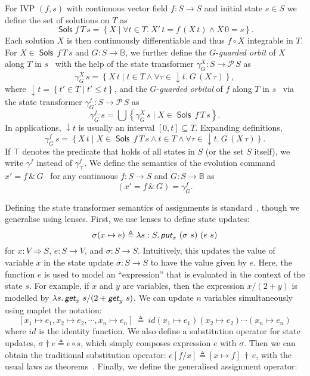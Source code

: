 \documentclass[envcountsame,envcountsect]{llncs}
\newcommand{\Pow}{\mathcal{P}}
\newcommand{\bools}{\mathbb{B}}
\newcommand{\Sols}{\mathop{\mathsf{Sols}}}
\newcommand{\defs}{\triangleq}
\newcommand{\lput}{\textit{\textsf{put}}}
\newcommand{\lget}{\textit{\textsf{get}}}
\newcommand{\lto}{\Longrightarrow}
\newcommand{\subapp}{\mathop{\,\dagger\,}}
\begin{document}
For IVP $(f,s)$ with continuous vector field $f:S\to S$ and initial
state $s\in S$ we define the set of solutions on
$T$ as
\begin{equation*}
\Sols f\, T\, s = \left\{X \mid \forall t\in T.\  X'\, t = f\, (X\, t)\land X\, 0 = s\right\}.
\end{equation*}
Each solution $X$ is then continuously differentiable and thus
$f\circ X$ integrable in $T$.  For $X\in \Sols\, f\, T\, s$ and
$G:S\to\bools$, we further define the $G$-\emph{guarded orbit} of $X$
along $T$ in $s$~\cite{MuniveS19} with the help of the state transformer
$\gamma^X_G:S\to \Pow\, S$ as 
\begin{equation*}
\gamma^X_{G}\, s= \left\{X\, t\mid t\in T\land \forall \tau\in
{\downarrow}t.\ G\, (X\, \tau)\right\},
\end{equation*}
where ${\downarrow}t = \left\{t'\in T\mid t'\le t\right\}$, and the
$G$-\emph{guarded orbital} of $f$ along $T$ in $s$~\cite{MuniveS19}
via the state transformer $\gamma^f_G:S\to \Pow\, S$ as
\begin{equation*}
  \gamma^f_G\ s = \bigcup\left\{\gamma^X_G\, s\mid X\in \Sols\, f\, T\, s\right\}.
\end{equation*}
In applications, ${\downarrow}t$ is usually an interval
$[0,t]\subseteq T$.  Expanding definitions,
\begin{equation*}
\gamma^f_G\, s = \left\{X\, t \mid X\in \Sols\, f\, T\, s \land t\in T
\land \forall \tau\in{\downarrow}t.\ G\, (X\, \tau)\right\}.
\end{equation*}
If $\top$ denotes the predicate that holds of all states in $S$ (or
the set $S$ itself), we write $\gamma^f$ instead of
$\gamma^f_\top$. We define the semantics of the evolution command
$x'= f\, \&\, G$~\cite{MuniveS19} for any continuous $f:S\to S$ and
$G:S\to \bools$ as
\begin{equation}
{\left(x'= f\, \&\, G\right)} = \gamma^f_G.\label{eq:st-evl}\tag{st-evl}
\end{equation}

Defining the state transformer semantics of assignments is
standard~\cite{MuniveS19}, though we generalise using lenses. First,
we use lenses to define state updates:
$$\sigma(x\mapsto e) \defs \lambda s : S.\, \lput_x ~ (\sigma~s) ~ (e~s)$$
for $x : V \lto S$, $e : S \to V$, and $\sigma : S \to S$.
Intuitively, this updates the value of variable $x$ in the state
update $\sigma : S \to S$ to have the value given by $e$. Here, the
function $e$ is used to model an ``expression'' that is evaluated in
the context of the state $s$. For example, if $x$ and $y$ are
variables, then the expression $x / (2 + y)$ is modelled by
$\lambda s. \, \lget_x~s / (2 + \lget_y~s)$. We can update $n$
variables simultaneously using maplet the notation:
$$[x_1 \mapsto e_1, x_2 \mapsto e_2, \cdots, x_n \mapsto e_n] ~\defs~ id(x_1 \mapsto e_1)(x_2 \mapsto e_2)\cdots(x_n \mapsto e_n)$$ 
where $id$ is the identity function. We also define a substitution
operator for state updates, $\sigma \dagger e \defs e \circ s$, which
simply composes expression $e$ with $\sigma$. Then we can obtain the
traditional substitution operator:
$e[f/x] \defs [x \mapsto f] \subapp e$, with the usual laws as
theorems~\cite{FosterZW16}. Finally, we define the generalised
assignment operator:
\end{document}
